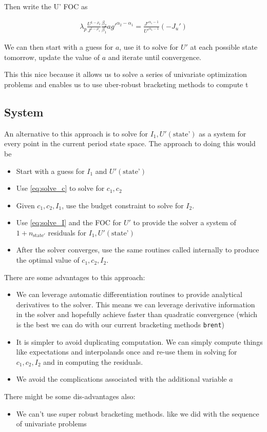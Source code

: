 \documentclass[10pt]{article}
\begin{document}
    Then write the U' FOC as

    \begin{align*}
      \lambda_p \frac{U^{1 - \rho_2}}{J^{1 - \rho_1}} \frac{\beta_2}{\beta_1} a g'^{\alpha_2 - \alpha_1} = \frac{J'^{\alpha_1 - 1}}{U'^{\alpha_1 - 1}} (-J_u')
    \end{align*}

    We can then start with a guess for $a$, use it to solve for $U'$ at each
    possible state tomorrow, update the value of $a$ and iterate until
    convergence.

    This this nice because it allows us to solve a series of univariate
    optimization problems and enables us to use uber-robust bracketing methods
    to compute t

    \subsection{System} \label{sub:system}

      An alternative to this approach is to solve for $I_1, U'(\text{state'})$ as a system for every point in the current period state space. The approach to doing this would be

      \begin{itemize}
        \item Start with a guess for $I_1$ and $U'(\text{state'})$
        \item Use \eqref{eq:solve_c} to solve for $c_1, c_2$
        \item Given $c_1, c_2, I_1$, use the budget constraint to solve for $I_2$.
        \item Use \eqref{eq:solve_I} and the FOC for $U'$ to provide the solver a system of $1 + n_{\text{state}'}$ residuals for $I_1, U'(\text{state'})$
        \item After the solver converges, use the same routines called internally to produce the optimal value of $c_1, c_2, I_2$.
      \end{itemize}

      There are some advantages to this approach:

      \begin{itemize}
        \item We can leverage automatic differentiation routines to provide analytical derivatives to the solver. This means we can leverage derivative information in the solver and hopefully achieve faster than quadratic convergence (which is the best we can do with our current bracketing methods \texttt{brent})
        \item It is simpler to avoid duplicating computation. We can simply compute things like expectations and interpolands once and re-use them in solving for $c_1, c_2, I_2$ and in computing the residuals.
        \item We avoid the complications associated with the additional variable $a$
      \end{itemize}

      There might be some dis-advantages also:

      \begin{itemize}
        \item We can't use super robust bracketing methods. like we did with the sequence of univariate problems
      \end{itemize}
\end{document}
